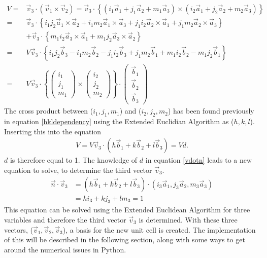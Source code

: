 \documentclass[11pt]{article} %
\begin{document}
\begin{eqnarray}
V = & \vec{v}_3 \cdot (\vec{v}_1 \times \vec{v}_2) = \vec{v}_3 \cdot \left\lbrace ( i_1\vec{a}_1+j_1\vec{a}_2+m_1\vec{a}_3) \times ( i_2\vec{a}_1+j_2\vec{a}_2+m_2\vec{a}_3) \right\rbrace \nonumber \\
= & \vec{v}_3 \cdot \left\lbrace i_1 j_2 \vec{a}_1 \times \vec{a}_2 + i_1 m_2 \vec{a}_1 \times \vec{a}_3 + j_1 i_2 \vec{a}_2 \times \vec{a}_1 + j_1 m_2 \vec{a}_2 \times \vec{a}_3 \right\rbrace \nonumber \\ & + \vec{v}_3 \cdot \left\lbrace m_1 i_2 \vec{a}_3 \times \vec{a}_1 + m_1 j_2 \vec{a}_3 \times \vec{a}_2 \right\rbrace \nonumber  \\
= & V\vec{v}_3 \cdot \left\lbrace i_1 j_2 \vec{b}_3 - i_1 m_2 \vec{b}_2 - j_1 i_2 \vec{b}_3 + j_1 m_2 \vec{b}_1 + m_1 i_2 \vec{b}_2 - m_1 j_2 \vec{b}_1 \right\rbrace \nonumber \\
= & V \vec{v}_3 \cdot \left\lbrace \left(\begin{array}{c} i_1 \\ j_1 \\ m_1 \end{array}\right) \times \left(\begin{array}{c} i_2 \\ j_2 \\ m_2 \end{array}\right) \right\rbrace \cdot \left(\begin{array}{c} \vec{b}_1 \\ \vec{b}_2 \\ \vec{b}_3 \end{array} \right)
\end{eqnarray}
The cross product between ($i_1, j_1, m_1$) and ($i_2, j_2, m_2$) has been found previously in equation \ref{hkldependency} using the Extended Euclidian Algorithm as ($h,k,l$). Inserting this into the equation 
\begin{eqnarray}
V = V \vec{v}_3 \cdot (h\vec{b}_1+k\vec{b}_2+l\vec{b}_3) = Vd.
\end{eqnarray}
$d$ is therefore equal to 1. The knowledge of $d$ in equation \ref{vdotn} leads to a new equation to solve, to determine the third vector $\vec{v}_3$.
\begin{eqnarray}
\vec{n} \cdot \vec{v}_3 & = (h \vec{b}_1 + k \vec{b}_2 + l \vec{b}_3 ) \cdot (i_3\vec{a}_1,j_3\vec{a}_2,m_3\vec{a}_3) \nonumber \\
 & = hi_3+kj_3+lm_3 = 1 \label{eq:ext_gcd}
\end{eqnarray}
This equation can be solved using the Extended Euclidean Algorithm for three variables and therefore the third vector $\vec{v}_3$ is determined. With these three vectors, ($\vec{v}_1, \vec{v}_2, \vec{v}_3$), a basis for the new unit cell is created. The implementation of this will be described in the following section, along with some ways to get around the numerical issues in Python.
\end{document}
